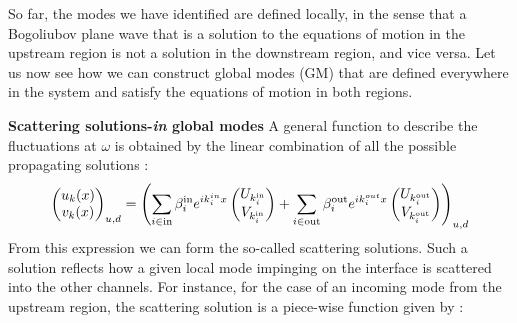 So far, the modes we have identified are defined locally, in the sense that a Bogoliubov plane wave that is a solution to the equations of motion in the upstream region is not a solution in the downstream region, and vice versa. Let us now
see how we can construct global modes (GM) that are defined everywhere in the system and satisfy the equations of motion in both regions.
\bigskip

\textbf{Scattering solutions-\textit{in} global modes}
A general function to describe the fluctuations at $\omega$ is obtained by the linear combination of all the possible propagating solutions :
\begin{equation}
    \begin{pmatrix}
        u_k(x) \\
        v_k(x)
    \end{pmatrix}_{u,d} = \left(\sum_{i\in \mathrm{in}}\beta^{\mathrm{in}}_i e^{ik^{in}_ix}\begin{pmatrix}
        U_{k^\mathrm{in}_i}  \\
        V_{k^\mathrm{in}_i}
    \end{pmatrix}+\sum_{i\in \mathrm{out}}\beta^{\mathrm{out}}_i e^{ik^{out}_ix}\begin{pmatrix}
        U_{k^\mathrm{out}_i}  \\
        V_{k^\mathrm{out}_i}
    \end{pmatrix}\right)_{u,d}
\end{equation}
From this expression we can form the so-called scattering solutions. Such a solution reflects how a given local mode impinging on the interface is scattered into the other channels.
For instance, for the case of an incoming mode from the upstream region, the scattering solution is a piece-wise function given by :


